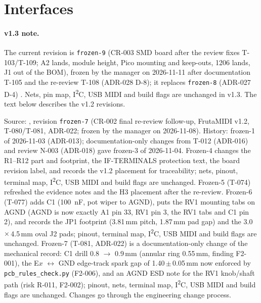 \section{Interfaces}
\label{sec:interfaces}

\paragraph{v1.3 note.} The current revision is \texttt{frozen-9} (CR-003 SMD board after the review
fixes T-103/T-109; A2 lands, module height, Pico mounting and keep-outs, 1206
lands, J1 out of the BOM), frozen by the manager on 2026-11-11 after documentation
T-105 and the re-review T-108 (ADR-028 D-8); it replaces \texttt{frozen-8}
(ADR-027 D-4)
. Nets, pin map, I\textsuperscript{2}C, USB MIDI and
build flags are unchanged in v1.3. The text below describes the v1.2 revisions.

Source: , revision \texttt{frozen-7} (CR-002 final re-review follow-up, FrutaMIDI v1.2,
T-080/T-081, ADR-022; frozen by the manager on 2026-11-08). History: frozen-1 of 2026-11-03
(ADR-013); documentation-only changes from T-012 (ADR-016) and review N-003
(ADR-018) gave frozen-3 of 2026-11-04. Frozen-4 changes the R1--R12 part and
footprint, the IF-TERMINALS protection text, the board revision label, and records
the v1.2 placement for traceability; nets, pinout, terminal map, I\textsuperscript{2}C,
USB MIDI and build flags are unchanged. Frozen-5 (T-074) refreshed the evidence
notes and the H3 placement after the re-review. Frozen-6 (T-077) adds C1
(\qty{100}{\nano\farad}, pot wiper to AGND), puts the RV1 mounting tabs on AGND
(AGND is now exactly A1 pin 33, RV1 pin 3, the RV1 tabs and C1 pin 2), and records
the JP1 footprint (3.81\,mm pitch, 1.87\,mm pad gap) and the 3.0\,$\times$\,4.5\,mm
oval J2 pads; pinout, terminal map, I\textsuperscript{2}C, USB MIDI and build flags
are unchanged. Frozen-7 (T-081, ADR-022) is a documentation-only change of the
mechanical record: C1 drill 0.8 $\rightarrow$ 0.9\,mm (annular ring 0.55\,mm,
finding F2-001), the E$x$ $\leftrightarrow$ GND edge-track spark gap of
1.40\,$\pm$\,0.05\,mm now enforced by \nolinkurl{pcb_rules_check.py} (F2-006), and
an AGND ESD note for the RV1 knob/shaft path (risk R-011, F2-002); pinout, nets,
terminal map, I\textsuperscript{2}C, USB MIDI and build flags are unchanged.
Changes go through the engineering change process.

